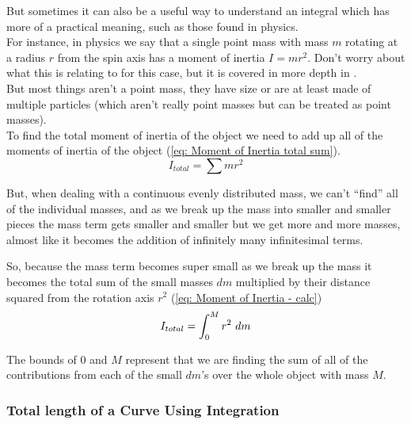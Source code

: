 \documentclass[main.tex]{subfiles}
\begin{document}
                But sometimes it can also be a useful way to understand an integral which has more of a practical meaning, such as those found in physics.\\
                For instance, in physics we say that a single point mass with mass $m$ rotating at a radius $r$ from the spin axis has a moment of inertia $I = mr^2$. Don't worry about what this is relating to for this case, but it is covered in more depth in .\\
                But most things aren't a point mass, they have size or are at least made of multiple particles (which aren't really point masses but can be treated as point masses).\\
                To find the total moment of inertia of the object we need to add up all of the moments of inertia of the object (\eqref{eq: Moment of Inertia total sum}).
                \begin{equation}
                    I_{total} = \sum mr^2
                    \label{eq: Moment of Inertia total sum}
                \end{equation}

                But, when dealing with a continuous evenly distributed mass, we can't ``find'' all of the individual masses, and as we break up the mass into smaller and smaller pieces the mass term gets smaller and smaller but we get more and more masses, almost like it becomes the addition of infinitely many infinitesimal terms.

                So, because the mass term becomes super small as we break up the mass it becomes the total sum of the small masses $dm$ multiplied by their distance squared from the rotation axis $r^2$ (\eqref{eq: Moment of Inertia - calc})
                \begin{equation}
                    I_{total} = \int_0^M r^2 \, \, d m
                    \label{eq: Moment of Inertia - calc}
                \end{equation}

                The bounds of $0$ and $M$ represent that we are finding the sum of all of the contributions from each of the small $dm$'s over the whole object with mass $M$.

                \newpage

                \subsubsection{Total length of a Curve Using Integration}
                    \label{subsubsec: Length of a Curve}
\end{document}
